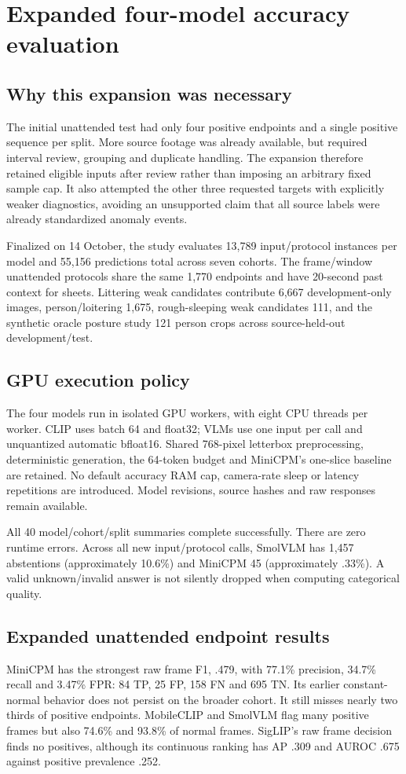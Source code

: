 \chapter{Expanded four-model accuracy evaluation}
\label{ch:expanded}
\section{Why this expansion was necessary}
The initial unattended test had only four positive endpoints and a single positive sequence per split. More source footage was already available, but required interval review, grouping and duplicate handling. The expansion therefore retained eligible inputs after review rather than imposing an arbitrary fixed sample cap. It also attempted the other three requested targets with explicitly weaker diagnostics, avoiding an unsupported claim that all source labels were already standardized anomaly events.

Finalized on 14 October, the study evaluates 13,789 input/protocol instances per model and 55,156 predictions total across seven cohorts. The frame/window unattended protocols share the same 1,770 endpoints and have 20-second past context for sheets. Littering weak candidates contribute 6,667 development-only images, person/loitering 1,675, rough-sleeping weak candidates 111, and the synthetic oracle posture study 121 person crops across source-held-out development/test.

\section{GPU execution policy}
The four models run in isolated GPU workers, with eight CPU threads per worker. CLIP uses batch 64 and float32; VLMs use one input per call and unquantized automatic bfloat16. Shared 768-pixel letterbox preprocessing, deterministic generation, the 64-token budget and MiniCPM's one-slice baseline are retained. No default accuracy RAM cap, camera-rate sleep or latency repetitions are introduced. Model revisions, source hashes and raw responses remain available.

All 40 model/cohort/split summaries complete successfully. There are zero runtime errors. Across all new input/protocol calls, SmolVLM has 1,457 abstentions (approximately 10.6\%) and MiniCPM 45 (approximately .33\%). A valid unknown/invalid answer is not silently dropped when computing categorical quality.

\section{Expanded unattended endpoint results}

MiniCPM has the strongest raw frame F1, .479, with 77.1\% precision, 34.7\% recall and 3.47\% FPR: 84 TP, 25 FP, 158 FN and 695 TN. Its earlier constant-normal behavior does not persist on the broader cohort. It still misses nearly two thirds of positive endpoints. MobileCLIP and SmolVLM flag many positive frames but also 74.6\% and 93.8\% of normal frames. SigLIP's raw frame decision finds no positives, although its continuous ranking has AP .309 and AUROC .675 against positive prevalence .252.

